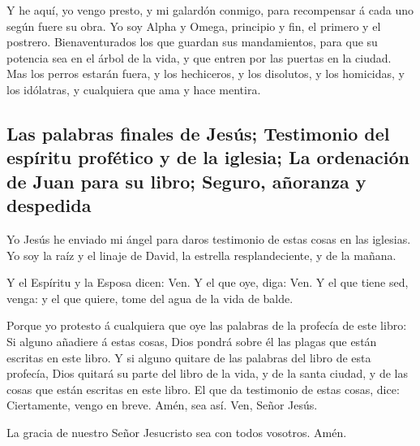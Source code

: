  Y he aquí, yo vengo presto, y mi galardón conmigo, para
recompensar á cada uno según fuere su obra.  Yo soy Alpha y
Omega, principio y fin, el primero y el postrero. 
Bienaventurados los que guardan sus mandamientos, para que su potencia
sea en el árbol de la vida, y que entren por las puertas en la ciudad.
 Mas los perros estarán fuera, y los hechiceros, y los
disolutos, y los homicidas, y los idólatras, y cualquiera que ama y hace
mentira.

\hypertarget{las-palabras-finales-de-jesuxfas-testimonio-del-espuxedritu-profuxe9tico-y-de-la-iglesia-la-ordenaciuxf3n-de-juan-para-su-libro-seguro-auxf1oranza-y-despedida}{%
\subsection{Las palabras finales de Jesús; Testimonio del espíritu
profético y de la iglesia; La ordenación de Juan para su libro; Seguro,
añoranza y
despedida}\label{las-palabras-finales-de-jesuxfas-testimonio-del-espuxedritu-profuxe9tico-y-de-la-iglesia-la-ordenaciuxf3n-de-juan-para-su-libro-seguro-auxf1oranza-y-despedida}}

 Yo Jesús he enviado mi ángel para daros testimonio de
estas cosas en las iglesias. Yo soy la raíz y el linaje de David, la
estrella resplandeciente, y de la mañana.

 Y el Espíritu y la Esposa dicen: Ven. Y el que oye, diga:
Ven. Y el que tiene sed, venga: y el que quiere, tome del agua de la
vida de balde.

 Porque yo protesto á cualquiera que oye las palabras de la
profecía de este libro: Si alguno añadiere á estas cosas, Dios pondrá
sobre él las plagas que están escritas en este libro.  Y si
alguno quitare de las palabras del libro de esta profecía, Dios quitará
su parte del libro de la vida, y de la santa ciudad, y de las cosas que
están escritas en este libro.  El que da testimonio de
estas cosas, dice: Ciertamente, vengo en breve. Amén, sea así. Ven,
Señor Jesús.

 La gracia de nuestro Señor Jesucristo sea con todos
vosotros. Amén.
